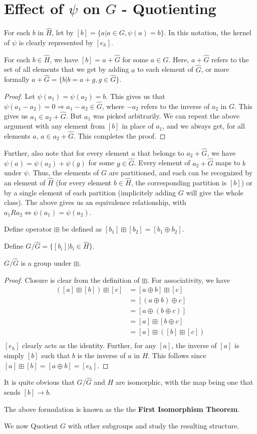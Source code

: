 \section{Effect of $\psi$ on $G$ - Quotienting}
For each $b$ in $\widehat{H}$, let by $[b] = \{ a|a \in G, \psi(a) = b \}$.
In this notation, the kernel of $\psi$ is clearly represented by $[e_{h}]$.
\begin{lemma} \label{lem:partition}
  For each $b \in \widehat{H}$, we have $[b] = a + \widehat{G}$ for some $a \in G$.
  Here, $a + \widehat{G}$ refers to the set of all elements that we get by adding $a$ to each element of $\widehat{G}$, or more formally $a + \widehat{G} = \{b|b=a+g, g \in \widehat{G} \}$.
\end{lemma}
\begin{proof}
  Let $\psi(a_{1}) = \psi(a_{2}) = b$.
  This gives us that $\psi(a_{1} - a_{2}) = 0 \Rightarrow a_{1} - a_{2} \in \widehat{G}$, where $-a_{2}$ refers to the inverse of $a_{2}$ in $G$.
  This gives us $a_{1} \in a_{2} + \widehat{G}$.
  But $a_{1}$ was picked arbitrarily.
  We can repeat the above argument with any element from $[b]$ in place of $a_{1}$, and we always get, for all elements $a$, $a \in a_{2} + \widehat{G}$.
  This completes the proof.
\end{proof}
Further, also note that for every element $a$ that belongs to $a_{2} + \widehat{G}$, we have $\psi(a) = \psi(a_{2}) + \psi(g)$ for some $g \in \widehat{G}$.
Every element of $a_{2} + \widehat{G}$ maps to $b$ under $\psi$.
Thus, the elements of $G$ are partitioned, and each can be recognized by an element of $\widehat{H}$ (for every element $b \in \widehat{H}$, the corresponding partition is $[b]$) or by a single element of each partition (implicitely adding $G$ will give the whole class).
The above gives us an equivalence relationship, with $a_{1} R a_{2} \Leftrightarrow \psi(a_{1}) = \psi(a_{2})$.
\par
Define operator $\boxplus$ be defined as $[b_{1}] \boxplus [b_{2}] = [b_{1} \oplus b_{2}]$.
\par
Define $G \Big/ \widehat{G} = \{ [b_{i}] | b_{i} \in \widehat{H} \}$.
\begin{lemma} \label{lem:quotientgroup}
  $G \Big/ \widehat{G}$ is a group under $\boxplus$.
\end{lemma}
\begin{proof}
  Closure is clear from the definition of $\boxplus$.
  For associativity, we have
  \begin{align*}
    ([a] \boxplus [b]) \boxplus[c] &= [a \oplus b] \boxplus [c] \\
    &= [(a \oplus b) \oplus c] \\
    &= [a \oplus (b \oplus c)] \\
    &= [a] \boxplus [b \oplus c] \\
    &= [a] \boxplus ([b] \boxplus [c]) \\
  \end{align*}
  $[e_{h}]$ clearly acts as the identity.
  Further, for any $[a]$, the inverse of $[a]$ is simply $[b]$ such that $b$ is the inverse of $a$ in $H$.
  This follows since $[a] \boxplus [b] = [a \oplus b] = [e_{h}]$.
\end{proof}
It is quite obvious that $G \big/ \widehat{G}$ and $H$ are isomorphic, with the map being one that sends $[b] \rightarrow b$.
\par
The above formulation is known as the the \textbf{First Isomorphism Theorem}.
\par
We now Quotient $G$ with other subgroups and study the resulting structure.
